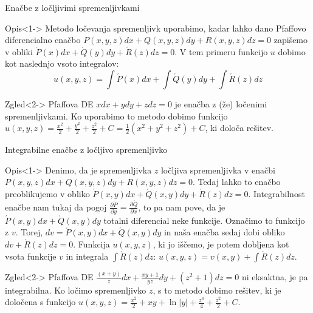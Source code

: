 \documentclass[t, 8pt]{beamer} %
\newcommand{\fillblack}[1]{
	\begin{tikzpicture}[remember picture, overlay]
		\node [shift={(0 cm,0cm)}]  at (current page.south west)
		{%
			\begin{tikzpicture}[remember picture, overlay] at (current page.south west)
				\draw [fill=black] (0, 0) -- (0,#1 \paperheight) --
				(\paperwidth,#1 \paperheight) -- (\paperwidth,0) -- cycle ;
			\end{tikzpicture}
		};
		\draw (current page.north west) rectangle (current page.south east);
	\end{tikzpicture}
}
\begin{document}
		\begin{frame}{Enačbe z ločljivimi spremenljivkami}
			\begin{block}{Opis}<1->
					Metodo ločevanja spremenljivk uporabimo, kadar lahko dano Pfaffovo diferencialno enačbo $P(x, y, z)dx + Q(x, y, z)dy + R(x, y, z)dz = 0$ zapišemo v obliki $\acute{P}(x)dx + \acute{Q}(y)dy + \acute{R}(z)dz = 0$. V tem primeru funkcijo $u$ dobimo kot naslednjo vsoto integralov: $$u(x, y, z) = \int \acute{P}(x)dx + \int \acute{Q}(y)dy + \int \acute{R}(z)dz$$
			\end{block}
			\begin{block}{Zgled}<2->
				Pfaffova DE $xdx + ydy + zdz = 0$ je enačba z (že) ločenimi spremenljivkami. Ko uporabimo to metodo dobimo funkcijo $u(x, y, z) = \frac{x^2}{2} + \frac{y^2}{2} + \frac{z^2}{2} + C = \frac{1}{2}(x^2 + y^2 + z^2) + C$, ki določa rešitev.
			\end{block}
		\end{frame}
		
		\begin{frame}{Integrabilne enačbe z ločljivo spremenljivko}
			\begin{block}{Opis}<1->
				Denimo, da je spremenljivka $z$ ločljiva spremenljivka v enačbi $P(x, y, z)dx + Q(x, y, z)dy + R(x, y, z)dz = 0$. Tedaj lahko to enačbo preoblikujemo v obliko $\acute{P}(x, y)dx + \acute{Q}(x, y)dy + \acute{R}(z)dz = 0$. Integrabilnost enačbe nam tukaj da pogoj $\frac{\partial \acute{P}}{\partial y} = \frac{\partial \acute{Q}}{\partial x}$, to pa nam pove, da je $\acute{P}(x, y)dx + \acute{Q}(x, y)dy$ totalni diferencial neke funkcije. Označimo to funkcijo z $v$. Torej, $dv = \acute{P}(x, y)dx + \acute{Q}(x, y)dy$ in naša enačba sedaj dobi obliko $dv + \acute{R}(z)dz = 0$. Funkcija $u(x, y, z)$, ki jo iščemo, je potem dobljena kot vsota funkcije $v$ in integrala $\int \acute{R}(z)dz$: $u(x, y, z) = v(x, y) + \int \acute{R}(z)dz$.
			\end{block}
			\begin{block}{Zgled}<2->
				Pfaffova DE $\frac{(x+y)}{z}dx + \frac{xy+1}{yz}dy + (z^2 + 1)dz = 0$ ni eksaktna, je pa integrabilna. Ko ločimo spremenljivko $z$, s to metodo dobimo rešitev, ki je določena s funkcijo $u(x, y, z) = \frac{x^2}{2} + xy + \ln|y| + \frac{z^4}{4} + \frac{z^2}{2} + C$.
			\end{block}
		\end{frame}
		
\end{document}
